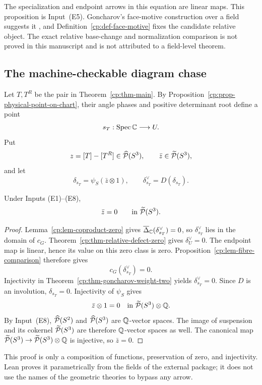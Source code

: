 The specialization and endpoint arrows in this equation are linear maps.
This proposition is Input~\textup{(E5)}.  Goncharov's face-motive
construction over a field suggests it \cite{Goncharov1999}, and
Definition~\ref{cp:def-face-motive} fixes the candidate relative object.
The exact relative base-change and normalization comparison is not proved
in this manuscript and is not attributed to a field-level theorem.

\subsection{The machine-checkable diagram chase}

Let \(T,T^R\) be the pair in Theorem~\ref{cp:thm-main}.  By
Proposition~\ref{cp:prop-physical-point-on-chart}, their angle phases and
positive determinant root define a point
\[
 s_T:\operatorname{Spec}\mathbb C\longrightarrow U.
\]
Put
\[
 z=[T]-[T^R]\in\widehat{\mathcal P}(S^3),\qquad
 \bar z\in\widetilde{\mathcal P}(S^3),
\]
and let
\[
 \delta_{s_T}=\psi_S(\bar z\otimes1),\qquad
 \delta_{s_T}^\vee=D(\delta_{s_T}).
\]

\begin{proposition}
\label{cp:prop-reduced-scissors-zero}
Under Inputs \textup{(E1)--(E8)},
\[
 \bar z=0\qquad\text{in }\widetilde{\mathcal P}(S^3).
\]
\end{proposition}

\begin{proof}
Lemma~\ref{cp:lem-coproduct-zero} gives
\(\overline\Delta_\mathbb C(\delta_{s_T}^\vee)=0\), so
\(\delta_{s_T}^\vee\) lies in the domain of \(c_G\).
Theorem~\ref{cp:thm-relative-defect-zero} gives
\(\delta_U^\vee=0\).  The endpoint map is linear, hence its value on this
zero class is zero.  Proposition~\ref{cp:lem-fibre-comparison} therefore
gives
\[
 c_G(\delta_{s_T}^\vee)=0.
\]
Injectivity in Theorem~\ref{cp:thm-goncharov-weight-two} yields
\(\delta_{s_T}^\vee=0\).  Since \(D\) is an involution,
\(\delta_{s_T}=0\).  Injectivity of \(\psi_S\) gives
\[
 \bar z\otimes1=0\quad\text{in }\widetilde{\mathcal P}(S^3)\otimes\mathbb Q.
\]
By Input~\textup{(E8)}, \(\widehat{\mathcal P}(S^2)\) and \(\widehat{\mathcal P}(S^3)\) are
\(\mathbb Q\)-vector spaces.  The image of suspension and its cokernel
\(\widetilde{\mathcal P}(S^3)\) are therefore \(\mathbb Q\)-vector spaces as well.  The canonical
map \(\widetilde{\mathcal P}(S^3)\to\widetilde{\mathcal P}(S^3)\otimes\mathbb Q\) is injective, so
\(\bar z=0\).
\end{proof}

This proof is only a composition of functions, preservation of zero, and
injectivity.  Lean proves it parametrically from the fields of the external
package; it does not use the names of the geometric theories to bypass any
arrow.

